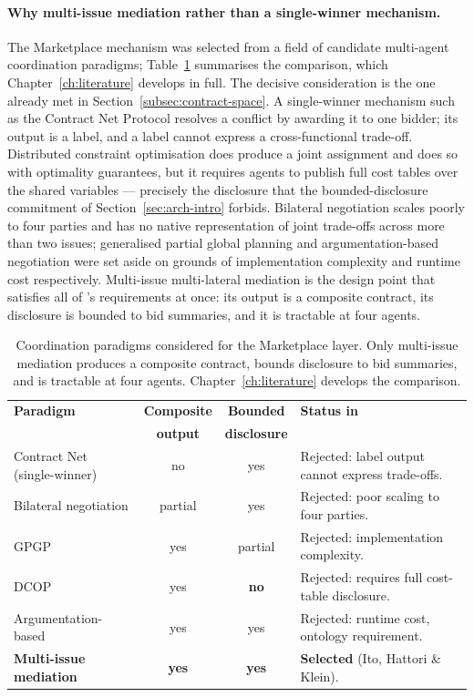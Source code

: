 \paragraph{Why multi-issue mediation rather than a single-winner mechanism.}
The Marketplace mechanism was selected from a field of candidate
multi-agent coordination paradigms; Table~\ref{tab:paradigms}
summarises the comparison, which Chapter~\ref{ch:literature} develops in
full. The decisive consideration is the one already met in
Section~\ref{subsec:contract-space}. A single-winner mechanism such as
the Contract Net Protocol \cite{smith1980,deen1997cnp} resolves a
conflict by awarding it to one bidder; its output is a label, and a
label cannot express a cross-functional trade-off. Distributed
constraint optimisation \cite{modi2005adopt,fioretto2018dcop} does
produce a joint assignment and does so with optimality guarantees, but
it requires agents to publish full cost tables over the shared
variables --- precisely the disclosure that the bounded-disclosure
commitment of Section~\ref{sec:arch-intro} forbids. Bilateral
negotiation \cite{faratin1998negotiation} scales poorly to four parties
and has no native representation of joint trade-offs across more than
two issues; generalised partial global planning \cite{decker1995gpgp}
and argumentation-based negotiation \cite{rahwan2003argumentation} were
set aside on grounds of implementation complexity and runtime cost
respectively. Multi-issue multi-lateral mediation
\cite{ito2007multiissue,fatima2004multiissue} is the design point that
satisfies all of \NEXUS{}'s requirements at once: its output is a
composite contract, its disclosure is bounded to bid summaries, and it
is tractable at four agents.

\begin{table}[ht]
\centering
\caption{Coordination paradigms considered for the Marketplace layer.
Only multi-issue mediation produces a composite contract, bounds
disclosure to bid summaries, and is tractable at four agents.
Chapter~\ref{ch:literature} develops the comparison.}
\label{tab:paradigms}
\small
\begin{tabularx}{\textwidth}{@{}l c c X@{}}
\toprule
\textbf{Paradigm} & \textbf{Composite} & \textbf{Bounded} & \textbf{Status in \NEXUS{}} \\
 & \textbf{output} & \textbf{disclosure} & \\
\midrule
Contract Net (single-winner) & no & yes &
  Rejected: label output cannot express trade-offs. \\
Bilateral negotiation & partial & yes &
  Rejected: poor scaling to four parties. \\
GPGP & yes & partial &
  Rejected: implementation complexity. \\
DCOP & yes & \textbf{no} &
  Rejected: requires full cost-table disclosure. \\
Argumentation-based & yes & yes &
  Rejected: runtime cost, ontology requirement. \\
\textbf{Multi-issue mediation} & \textbf{yes} & \textbf{yes} &
  \textbf{Selected} (Ito, Hattori \& Klein). \\
\bottomrule
\end{tabularx}
\end{table}

